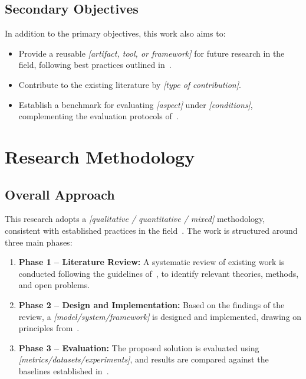 \subsection{Secondary Objectives}
\label{subsec:secondary-obj}

In addition to the primary objectives, this work also aims to:

\begin{itemize}
    \item Provide a reusable \textit{[artifact, tool, or framework]} for
          future research in the field, following best practices outlined
          in~\cite{researchmethod2017}.
    \item Contribute to the existing literature by \textit{[type of contribution]}.
    \item Establish a benchmark for evaluating \textit{[aspect]} under
          \textit{[conditions]}, complementing the evaluation protocols
          of~\cite{challenge_paper2021}.
\end{itemize}

\section{Research Methodology}
\label{sec:methodology}

\subsection{Overall Approach}
\label{subsec:approach}

This research adopts a \textit{[qualitative / quantitative / mixed]} methodology,
consistent with established practices in the field~\cite{researchmethod2017}.
The work is structured around three main phases:

\begin{enumerate}
    \item \textbf{Phase 1 -- Literature Review:} A systematic review of existing
          work is conducted following the guidelines of~\cite{survey2020field},
          to identify relevant theories, methods, and open problems.
    \item \textbf{Phase 2 -- Design and Implementation:} Based on the findings
          of the review, a \textit{[model/system/framework]} is designed and
          implemented, drawing on principles from~\cite{author_method2019}.
    \item \textbf{Phase 3 -- Evaluation:} The proposed solution is evaluated
          using \textit{[metrics/datasets/experiments]}, and results are compared
          against the baselines established in~\cite{problemref2018}.
\end{enumerate}

